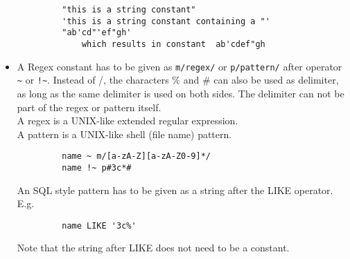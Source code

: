 \begin{itemize}
\begin{verbatim}
         "this is a string constant"
         'this is a string constant containing a "'
         "ab'cd"'ef"gh'
             which results in constant  ab'cdef"gh
       \end{verbatim}
  \item A Regex constant has to be given as \texttt{m/regex/} or
       \texttt{p/pattern/} after operator \verb+~+ or \verb+!~+.
       Instead of /, the characters \% and \# can also be used as
       delimiter, as long as the same delimiter is used on both sides.
       The delimiter can not be part of the regex or pattern itself.
       \\A regex is a UNIX-like extended regular expression.
       \\A pattern is a UNIX-like shell (file name) pattern.
       \begin{verbatim}
         name ~ m/[a-zA-Z][a-zA-Z0-9]*/
         name !~ p#3c*#
       \end{verbatim}

       An SQL style pattern has to be given as a string after the LIKE
       operator. E.g.
       \begin{verbatim}
         name LIKE '3c%'
       \end{verbatim}
       Note that the string after LIKE does not need to be a constant.


\end{itemize}
